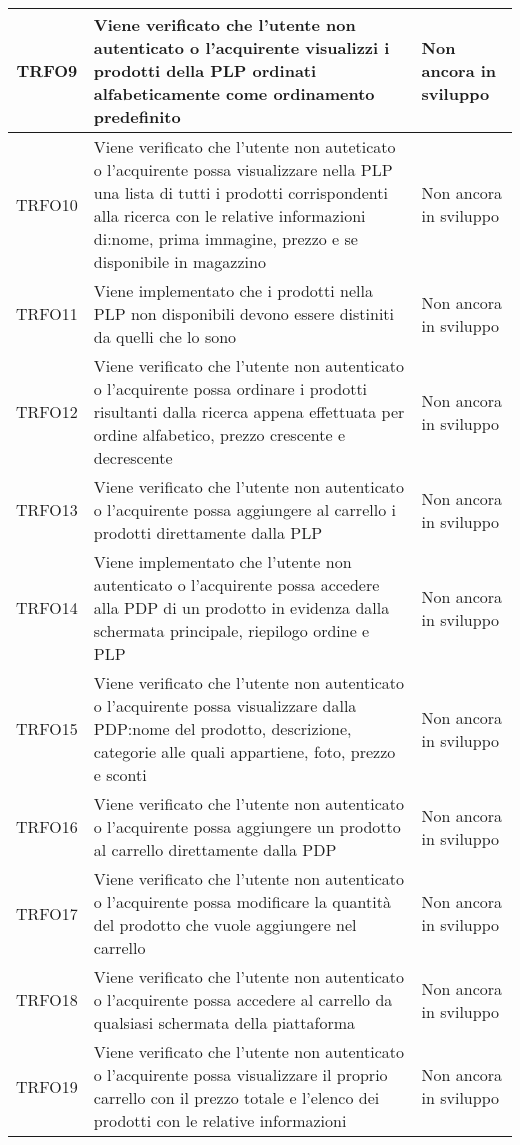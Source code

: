 \begin{longtable}{|c| C{10cm} |C{3cm}|}
	TRFO9 & Viene verificato che l'utente non autenticato o l'acquirente visualizzi i prodotti della PLP ordinati alfabeticamente come ordinamento predefinito & Non ancora in sviluppo\\ \hline
	TRFO10 & Viene verificato che l'utente non auteticato o l'acquirente possa visualizzare nella PLP una lista di tutti i prodotti corrispondenti alla ricerca con le relative informazioni di:nome, prima immagine, prezzo e se disponibile in magazzino & Non ancora in sviluppo \\ \hline
	TRFO11 & Viene implementato che i prodotti nella PLP non disponibili devono essere distiniti da quelli che lo sono & Non ancora in sviluppo \\ \hline
	TRFO12 & Viene verificato che l'utente non autenticato o l'acquirente possa ordinare i prodotti risultanti dalla ricerca appena effettuata per ordine alfabetico, prezzo crescente e decrescente & Non ancora in sviluppo \\ \hline
	TRFO13 & Viene verificato che l'utente non autenticato o l'acquirente possa aggiungere al carrello i prodotti direttamente dalla PLP & Non ancora in sviluppo\\ \hline
	TRFO14 & Viene implementato che l'utente non autenticato o l'acquirente possa accedere alla PDP di un prodotto in evidenza dalla schermata principale, riepilogo ordine e PLP & Non ancora in sviluppo \\ \hline
	TRFO15 & Viene verificato che l'utente non autenticato o l'acquirente possa visualizzare dalla PDP:nome del prodotto, descrizione, categorie alle quali appartiene, foto, prezzo e sconti & Non ancora in sviluppo \\ \hline
	TRFO16 & Viene verificato che l'utente non autenticato o l'acquirente possa aggiungere un prodotto al carrello direttamente dalla PDP  & Non ancora in sviluppo\\ \hline
	TRFO17 & Viene verificato che l'utente non autenticato o l'acquirente possa modificare la quantità del prodotto che vuole aggiungere nel carrello & Non ancora in sviluppo\\ \hline
	TRFO18 & Viene verificato che l'utente non autenticato o l'acquirente possa accedere al carrello da qualsiasi schermata della piattaforma & Non ancora in sviluppo \\ \hline
           TRFO19 & Viene verificato che l'utente non autenticato o l'acquirente possa visualizzare il proprio carrello con il prezzo totale e l'elenco dei prodotti con le relative informazioni & Non ancora in sviluppo\\ \hline

\end{longtable}
